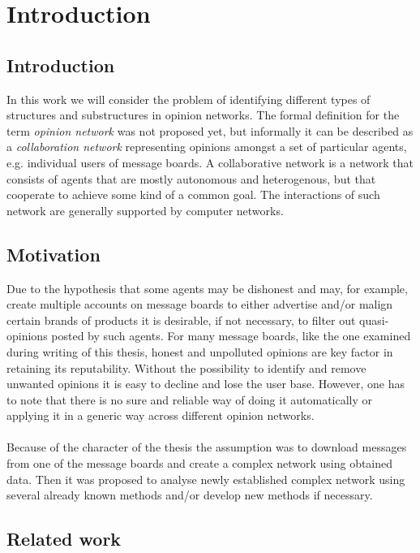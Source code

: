 \chapter{Introduction}

  \section{Introduction}

    In this work we will consider the problem of identifying different types of structures and substructures in opinion networks. The formal definition for the term \emph{opinion network} was not proposed yet, but informally it can be described as a \emph{collaboration network} representing opinions amongst a set of particular agents, e.g. individual users of message boards. A collaborative network is a network that consists of agents that are mostly autonomous and heterogenous, but that cooperate to achieve some kind of a common goal. The interactions of such network are generally supported by computer networks.

  \section{Motivation}

    Due to the hypothesis that some agents may be dishonest and may, for example, create multiple accounts on message boards to either advertise and/or malign certain brands of products it is desirable, if not necessary, to filter out quasi-opinions posted by such agents. For many message boards, like the one examined during writing of this thesis, honest and unpolluted opinions are key factor in retaining its reputability. Without the possibility to identify and remove unwanted opinions it is easy to decline and lose the user base. However, one has to note that there is no sure and reliable way of doing it automatically or applying it in a generic way across different opinion networks.
    \\\\
    Because of the character of the thesis the assumption was to download messages from one of the message boards and create a complex network using obtained data. Then it was proposed to analyse newly established complex network using several already known methods and/or develop new methods if necessary.

  \section{Related work}

